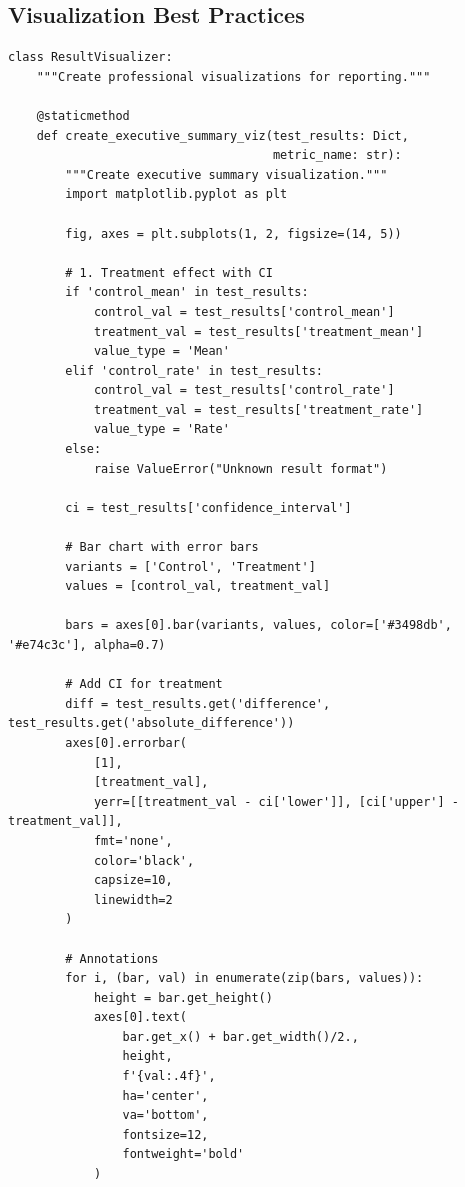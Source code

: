 \subsection{Visualization Best Practices}

\lstset{language=Python, caption=Professional Result Visualization}
\begin{lstlisting}
class ResultVisualizer:
    """Create professional visualizations for reporting."""

    @staticmethod
    def create_executive_summary_viz(test_results: Dict,
                                     metric_name: str):
        """Create executive summary visualization."""
        import matplotlib.pyplot as plt

        fig, axes = plt.subplots(1, 2, figsize=(14, 5))

        # 1. Treatment effect with CI
        if 'control_mean' in test_results:
            control_val = test_results['control_mean']
            treatment_val = test_results['treatment_mean']
            value_type = 'Mean'
        elif 'control_rate' in test_results:
            control_val = test_results['control_rate']
            treatment_val = test_results['treatment_rate']
            value_type = 'Rate'
        else:
            raise ValueError("Unknown result format")

        ci = test_results['confidence_interval']

        # Bar chart with error bars
        variants = ['Control', 'Treatment']
        values = [control_val, treatment_val]

        bars = axes[0].bar(variants, values, color=['#3498db', '#e74c3c'], alpha=0.7)

        # Add CI for treatment
        diff = test_results.get('difference', test_results.get('absolute_difference'))
        axes[0].errorbar(
            [1],
            [treatment_val],
            yerr=[[treatment_val - ci['lower']], [ci['upper'] - treatment_val]],
            fmt='none',
            color='black',
            capsize=10,
            linewidth=2
        )

        # Annotations
        for i, (bar, val) in enumerate(zip(bars, values)):
            height = bar.get_height()
            axes[0].text(
                bar.get_x() + bar.get_width()/2.,
                height,
                f'{val:.4f}',
                ha='center',
                va='bottom',
                fontsize=12,
                fontweight='bold'
            )


\end{lstlisting}

